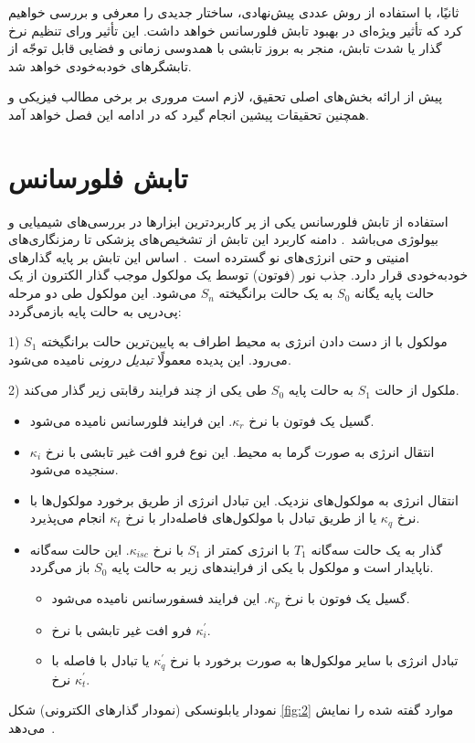 ثانیًا، با استفاده از روش عددی پیش‌نهادی،‌ ساختار  جدیدی را معرفی و بررسی خواهیم کرد که تأثیر ویژه‌ای در بهبود تابش فلورسانس خواهد داشت. این تأثیر ورای تنظیم نرخ گذار یا شدت تابش، منجر به بروز تابشی با همدوسی زمانی و فضایی قابل توجّه از تابشگر‌های خودبه‌خودی خواهد شد.

پیش‌ از ارائه بخش‌های اصلی تحقیق، لازم است مروری بر برخی مطالب فیزیکی و همچنین تحقیقات پیشین انجام گیرد که در ادامه این فصل خواهد آمد.

\section{تابش فلورسانس}
استفاده از تابش فلورسانس یکی از پر کاربردترین ابزارها در بررسی‌های شیمیایی و بیولوژی می‌باشد~\cite{Shcheslavskiy:18,giljohann2009}. دامنه کاربرد این تابش از تشخیص‌های پزشکی تا رمزنگاری‌های امنیتی و حتی انرژی‌های نو گسترده است~\cite{PhysRevX.6.011011,PhysRevA.97.042501,giljohann2009,lazcka2007,bauch2014}.  اساس این تابش بر پایه گذارهای خودبه‌خودی قرار دارد.
جذب نور (فوتون) توسط یک مولکول موجب گذار الکترون از یک حالت پایه یگانه $S_0$ به یک حالت برانگیخته $S_n$ می‌شود. این مولکول طی دو مرحله پی‌درپی به حالت پایه بازمی‌گردد:

1) مولکول با از دست دادن انرژی به محیط اطراف به پایین‌ترین حالت برانگیخته $S_1$ می‌رود. این پدیده معمولًا \emph{تبدیل درونی} نامیده می‌شود.

2) ملکول از حالت $S_1$ به حالت پایه $S_0$ طی یکی از چند فرایند رقابتی زیر گذار می‌کند.
\begin{itemize}\itemsep2pt
	\item گسیل یک فوتون با نرخ $\kappa_r$. این فرایند فلورسانس نامیده می‌شود.
	\item انتقال انرژی به صورت گرما به محیط. این نوع فرو افت غیر تابشی با نرخ $\kappa_i$ سنجیده می‌شود.
	\item انتقال انرژی به مولکول‌های نزدیک. این تبادل انرژی از طریق برخورد مولکول‌ها با نرخ $\kappa_q$ یا از طریق تبادل با مولکول‌های فاصله‌دار با نرخ $\kappa_t$ انجام می‌پذیرد.
	\item گذار به یک حالت سه‌گانه $T_1$ با انرژی کمتر از $S_1$ با نرخ $\kappa_{isc}$. این حالت سه‌گانه ناپایدار است و مولکول با یکی از فرایندهای زیر به حالت پایه $S_0$ باز می‌گردد.
	\begin{itemize}
		\item گسیل یک فوتون با نرخ $\kappa_p$. این فرایند فسفورسانس نامیده می‌شود.
		\item فرو افت غیر تابشی با نرخ $\kappa^\prime_i$.
		\item تبادل انرژی با سایر مولکول‌ها به صورت برخورد با نرخ $\kappa^\prime_q$ یا تبادل با فاصله با نرخ $\kappa^\prime_t$.
	\end{itemize}
\end{itemize}
نمودار یابلونسکی (نمودار گذارهای الکترونی) شکل \ref{fig:2} موارد گفته شده را نمایش می‌دهد~\cite{albani2008principles}.

